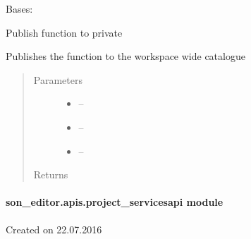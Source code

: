 \documentclass[letterpaper,10pt,english]{sphinxmanual}
\begin{document}
\begin{fulllineitems}
\label{_source/son_editor.apis:son_editor.apis.project_functionsapi.PrivateService}
Bases: 

\begin{fulllineitems}
\label{_source/son_editor.apis:son_editor.apis.project_functionsapi.PrivateService.get}
Publish function to private

Publishes the function to the workspace wide catalogue
\begin{quote}\begin{description}
\item[{Parameters}] \leavevmode\begin{itemize}
\item {} 
 -- 

\item {} 
 -- 

\item {} 
 -- 

\end{itemize}

\item[{Returns}] \leavevmode


\end{description}\end{quote}

\end{fulllineitems}


\begin{fulllineitems}
\label{_source/son_editor.apis:son_editor.apis.project_functionsapi.PrivateService.methods}
\end{fulllineitems}


\end{fulllineitems}



\paragraph{son\_editor.apis.project\_servicesapi module}
\label{_source/son_editor.apis:module-son_editor.apis.project_servicesapi}\label{_source/son_editor.apis:son-editor-apis-project-servicesapi-module}
Created on 22.07.2016
\end{document}
